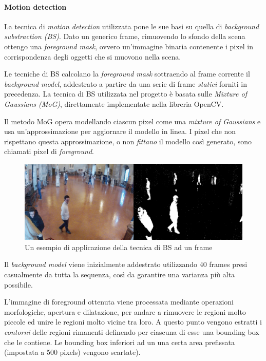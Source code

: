 \paragraph{Motion detection}

La tecnica di \emph{motion detection} utilizzata pone le sue basi su quella di \emph{background substraction (BS)}. Dato un generico frame, rimuovendo lo sfondo della scena ottengo una \emph{foreground mask}, ovvero un'immagine binaria contenente i pixel in corrispondenza degli oggetti che si muovono nella scena.

Le tecniche di BS calcolano la \emph{foreground mask} sottraendo al frame corrente il \emph{background model}, addestrato a partire da una serie di frame \emph{statici} forniti in precedenza. La tecnica di BS utilizzata nel progetto è basata sulle \emph{Mixture of Gaussians (MoG)}, direttamente implementate nella libreria OpenCV.

Il metodo MoG opera modellando ciascun pixel come una \emph{mixture of Gaussians} e usa un'approssimazione per aggiornare il modello in linea. I pixel che non rispettano questa approssimazione, o non \emph{fittano} il modello così generato, sono chiamati pixel di \emph{foreground}.

\begin{figure}[h]
\centering
\includegraphics[width=.9\linewidth]{images/frame_mog.jpg}
  \caption{Un esempio di applicazione della tecnica di BS ad un frame}
  \label{fig:mog}
\end{figure}

Il \emph{background model} viene inizialmente addestrato utilizzando 40 frames presi casualmente da tutta la sequenza, così da garantire una varianza più alta possibile.

L'immagine di foreground ottenuta viene processata mediante operazioni morfologiche, apertura e dilatazione, per andare a rimuovere le regioni molto piccole ed unire le regioni molto vicine tra loro. A questo punto vengono estratti i \emph{contorni} delle regioni rimanenti definendo per ciascuna di esse una bounding box che le contiene. Le bounding box inferiori ad un una certa area prefissata (impostata a 500 pixels) vengono scartate).

